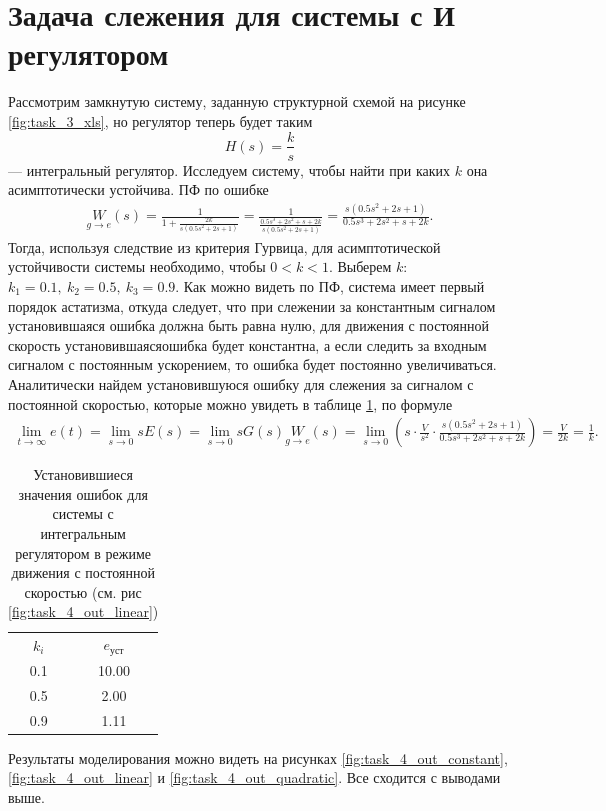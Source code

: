 \section{Задача слежения для системы с И регулятором}

Рассмотрим замкнутую систему, заданную структурной схемой на рисунке \ref{fig:task_3_xls},
но регулятор теперь будет таким
\begin{equation*}
    H(s)=\frac{k}{s}
\end{equation*}
--- интегральный регулятор. Исследуем систему, чтобы найти при каких $k$ она асимптотически
устойчива. ПФ по ошибке
\begin{multline*}
    \underset{g\rightarrow e}{W}(s)=\frac{1}{1+\frac{2k}{s(0.5s^2+2s+1)}}=\frac{1}{\frac{0.5s^3+2s^2+s+2k}{s(0.5s^2+2s+1)}}=\frac{s(0.5s^2+2s+1)}{0.5s^3+2s^2+s+2k}.
\end{multline*}
Тогда, используя следствие из критерия Гурвица, для асимптотической устойчивости системы
необходимо, чтобы $0<k<1$. Выберем $k$: $k_1=0.1,\ k_2=0.5,\ k_3=0.9$.
Как можно видеть по ПФ, система имеет первый порядок астатизма, откуда следует, что при слежении за
константным сигналом установившаяся ошибка должна быть равна нулю, для движения с постоянной 
скорость установившаясяошибка будет константна, а если следить за входным сигналом с 
постоянным ускорением, то ошибка будет постоянно увеличиваться. Аналитически найдем
установившуюся ошибку для слежения за сигналом с постоянной скоростью, которые можно
увидеть в таблице \ref{tab:task_4_out}, по формуле
\begin{multline*}
    \lim_{t\rightarrow\infty}e(t)=\lim_{s\rightarrow0}sE(s)=\lim_{s\rightarrow0}sG(s)\underset{g\rightarrow e}{W}(s)
    =\lim_{s\rightarrow0}\left(s\cdot\frac{V}{s^2}\cdot\frac{s(0.5s^2+2s+1)}{0.5s^3+2s^2+s+2k}\right)
    =\frac{V}{2k}=\frac{1}{k}.
\end{multline*}
\begin{table}[H]
    \centering
    \caption{Установившиеся значения ошибок для системы с интегральным регулятором в режиме движения с постоянной скоростью (см. рис \ref{fig:task_4_out_linear})}
    \begin{tabular}{|c|c|}
        \hline
        $k_i$ & $e_\text{уст}$\\[2mm]
        0.1 & 10.00 \\[2mm]
        0.5 & 2.00 \\[2mm]
        0.9 & 1.11 \\[2mm]
        \hline
    \end{tabular}
    \label{tab:task_4_out}
\end{table}
Результаты моделирования можно видеть на рисунках \ref{fig:task_4_out_constant}, 
\ref{fig:task_4_out_linear} и \ref{fig:task_4_out_quadratic}. Все сходится с выводами выше.

